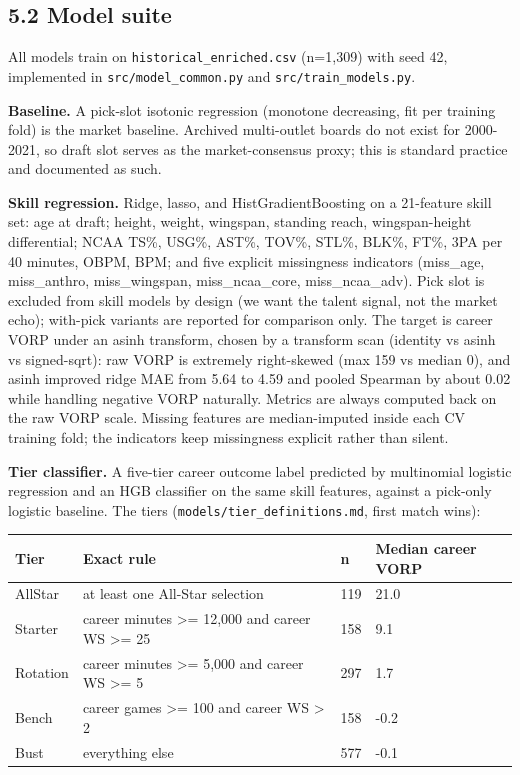 \documentclass[
  10pt,
]{article}
\newcounter{none} %
\begin{document}
\subsection{5.2 Model suite}\label{model-suite}

All models train on \texttt{historical\_enriched.csv} (n=1,309) with seed 42,
implemented in \texttt{src/model\_common.py} and \texttt{src/train\_models.py}.

\textbf{Baseline.} A pick-slot isotonic regression (monotone decreasing, fit per
training fold) is the market baseline. Archived multi-outlet boards do not exist
for 2000-2021, so draft slot serves as the market-consensus proxy; this is
standard practice and documented as such.

\textbf{Skill regression.} Ridge, lasso, and HistGradientBoosting on a
21-feature skill set: age at draft; height, weight, wingspan, standing reach,
wingspan-height differential; NCAA TS\%, USG\%, AST\%, TOV\%, STL\%, BLK\%,
FT\%, 3PA per 40 minutes, OBPM, BPM; and five explicit missingness indicators
(miss\_age, miss\_anthro, miss\_wingspan, miss\_ncaa\_core, miss\_ncaa\_adv).
Pick slot is excluded from skill models by design (we want the talent signal,
not the market echo); with-pick variants are reported for comparison only. The
target is career VORP under an asinh transform, chosen by a transform scan
(identity vs asinh vs signed-sqrt): raw VORP is extremely right-skewed (max 159
vs median 0), and asinh improved ridge MAE from 5.64 to 4.59 and pooled Spearman
by about 0.02 while handling negative VORP naturally. Metrics are always
computed back on the raw VORP scale. Missing features are median-imputed inside
each CV training fold; the indicators keep missingness explicit rather than
silent.

\textbf{Tier classifier.} A five-tier career outcome label predicted by
multinomial logistic regression and an HGB classifier on the same skill
features, against a pick-only logistic baseline. The tiers
(\texttt{models/tier\_definitions.md}, first match wins):

{\def\LTcaptype{none} %
\begin{longtable}[]{@{}llll@{}}
\toprule\noalign{}
Tier & Exact rule & n & Median career VORP \\
\midrule\noalign{}
\endhead
\bottomrule\noalign{}
\endlastfoot
AllStar & at least one All-Star selection & 119 & 21.0 \\
Starter & career minutes \textgreater= 12,000 and career WS \textgreater= 25 &
158 & 9.1 \\
Rotation & career minutes \textgreater= 5,000 and career WS \textgreater= 5 &
297 & 1.7 \\
Bench & career games \textgreater= 100 and career WS \textgreater{} 2 & 158 &
-0.2 \\
Bust & everything else & 577 & -0.1 \\
\end{longtable}
}
\end{document}
